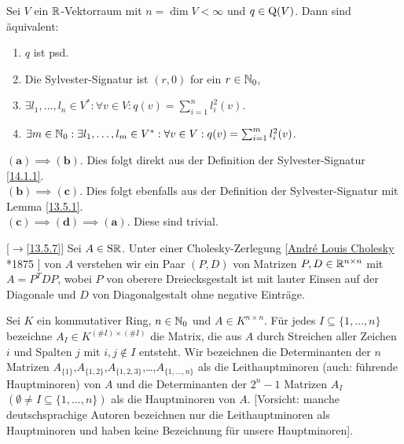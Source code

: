 \documentclass[../../main.tex]{subfiles}
\begin{document}
\begin{sat}\label{14.2.7}
Sei $V$ ein $\mathbb R$-Vektorraum mit $n=\dim V<\infty$ und $q\in \operatorname{Q}(V)$. Dann sind äquivalent:
\begin{enumerate}[\normalfont(a)]
\item $q$ ist psd.
\item Die Sylvester-Signatur ist $(r,0)$ for ein $r\in \mathbb N_0$,
\item $\exists l_1,\ldots ,l_n\in V^*: \forall v\in V: q(v)=\sum_{i=1}^nl_i^2(v)$.
\item $\exists m\in \mathbb N_0:\exists l_1,\ldots ,l_m\in V^*: \forall v\in V: q(v)=\sum_{i=1}^ml_i^2(v)$.
\end{enumerate}
\end{sat}
\begin{cproof}
$\boldsymbol{(a)\implies(b)}$. Dies folgt direkt aus der Definition der Sylvester-Signatur \ref{14.1.1}.\\

\noindent$\boldsymbol{(b)\implies(c)}$. Dies folgt ebenfalls aus der Definition der Sylvester-Signatur mit Lemma \ref{13.5.1}.\\

\noindent $\boldsymbol{(c)\implies(d)\implies(a)}$. Diese sind trivial.
\end{cproof}

\begin{df}\mbox{}[$\to$\ref{13.5.7}]
\label{14.2.8}
Sei $A\in \operatorname{S\mathbb R}$. Unter einer Cholesky-Zerlegung [\href{https://en.wikipedia.org/wiki/Andre-Louis_Cholesky}{Andr\'{e} Louis Cholesky} *1875 ] von $A$ verstehen wir ein Paar $(P,D)$ von Matrizen $P,D\in \mathbb R^{n\times n}$ mit $A=P^TDP$, wobei $P$ von oberere Dreiecksgestalt ist mit lauter Einsen auf der Diagonale und $D$ von Diagonalgestalt ohne negative Einträge.
\end{df}

\begin{df}\label{14.2.9}
Sei $K$ ein kommutativer Ring, $n\in \mathbb N_0$ und $A\in K^{n\times n}$. Für jedes $I\subseteq\{1,\ldots ,n\}$ bezeichne $A_I\in K^{(\#I)\times (\#I)}$ die Matrix, die aus $A$ durch Streichen aller Zeichen $i$ und Spalten $j$ mit $i,j\notin I$ entsteht. Wir bezeichnen die Determinanten der $n$ Matrizen $A_{\{1\}}$,$A_{\{1,2\}}$,$A_{\{1,2,3\}}$,\ldots ,$A_{\{1,\ldots ,n\}}$ als die Leithauptminoren (auch: führende Hauptminoren) von $A$ und die Determinanten der $2^{n}-1$ Matrizen $A_I$ $(\emptyset \neq I\subseteq\{1,\ldots ,n\})$ als die Hauptminoren von $A$. [Vorsicht: manche deutschsprachige Autoren bezeichnen nur die Leithauptminoren als Hauptminoren und haben keine Bezeichnung für unsere Hauptminoren].
\end{df}
\end{document}
